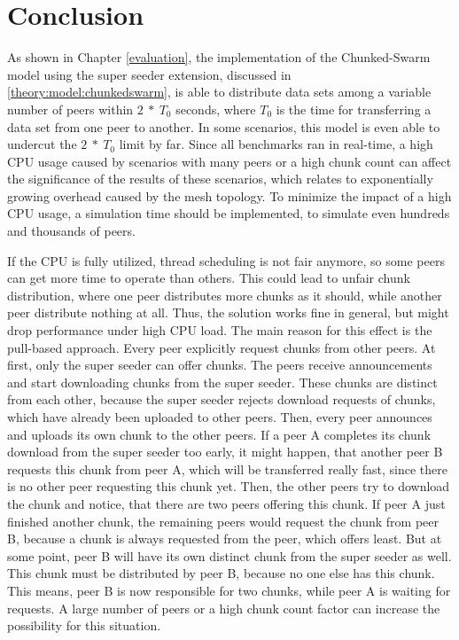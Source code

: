 
\chapter{Conclusion}
\label{conclusion}

As shown in Chapter \ref{evaluation}, the implementation of the Chunked-Swarm model using the super seeder extension, discussed in \ref{theory:model:chunkedswarm}, is able to distribute data sets among a variable number of peers within $2\:*\:T_0$ seconds, where $T_0$ is the time for transferring a data set from one peer to another. In some scenarios, this model is even able to undercut the $2\:*\:T_0$ limit by far. Since all benchmarks ran in real-time, a high CPU usage caused by scenarios with many peers or a high chunk count can affect the significance of the results of these scenarios, which relates to exponentially growing overhead caused by the mesh topology. To minimize the impact of a high CPU usage, a simulation time should be implemented, to simulate even hundreds and thousands of peers.

If the CPU is fully utilized, thread scheduling is not fair anymore, so some peers can get more time to operate than others. This could lead to unfair chunk distribution, where one peer distributes more chunks as it should, while another peer distribute nothing at all. Thus, the solution works fine in general, but might drop performance under high CPU load. The main reason for this effect is the pull-based approach. Every peer explicitly request chunks from other peers. At first, only the super seeder can offer chunks. The peers receive announcements and start downloading chunks from the super seeder. These chunks are distinct from each other, because the super seeder rejects download requests of chunks, which have already been uploaded to other peers. Then, every peer announces and uploads its own chunk to the other peers. If a peer A completes its chunk download from the super seeder too early, it might happen, that another peer B requests this chunk from peer A, which will be transferred really fast, since there is no other peer requesting this chunk yet. Then, the other peers try to download the chunk and notice, that there are two peers offering this chunk. If peer A just finished another chunk, the remaining peers would request the chunk from peer B, because a chunk is always requested from the peer, which offers least. But at some point, peer B will have its own distinct chunk from the super seeder as well. This chunk must be distributed by peer B, because no one else has this chunk. This means, peer B is now responsible for two chunks, while peer A is waiting for requests. A large number of peers or a high chunk count factor can increase the possibility for this situation.

